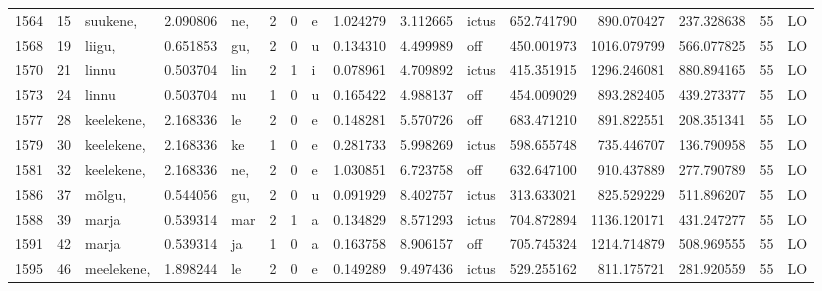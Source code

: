 \begin{tabular}{lrlrllllrrlrrrll}
1564 &          15 &         suukene, &  2.090806 &     ne, &        2 &      0 &       e &      1.024279 &      3.112665 &  ictus &   652.741790 &   890.070427 &   237.328638 &     55 &        LO \\
1568 &          19 &           liigu, &  0.651853 &     gu, &        2 &      0 &       u &      0.134310 &      4.499989 &    off &   450.001973 &  1016.079799 &   566.077825 &     55 &        LO \\
1570 &          21 &            linnu &  0.503704 &     lin &        2 &      1 &       i &      0.078961 &      4.709892 &  ictus &   415.351915 &  1296.246081 &   880.894165 &     55 &        LO \\
1573 &          24 &            linnu &  0.503704 &      nu &        1 &      0 &       u &      0.165422 &      4.988137 &    off &   454.009029 &   893.282405 &   439.273377 &     55 &        LO \\
1577 &          28 &       keelekene, &  2.168336 &      le &        2 &      0 &       e &      0.148281 &      5.570726 &    off &   683.471210 &   891.822551 &   208.351341 &     55 &        LO \\
1579 &          30 &       keelekene, &  2.168336 &      ke &        1 &      0 &       e &      0.281733 &      5.998269 &  ictus &   598.655748 &   735.446707 &   136.790958 &     55 &        LO \\
1581 &          32 &       keelekene, &  2.168336 &     ne, &        2 &      0 &       e &      1.030851 &      6.723758 &    off &   632.647100 &   910.437889 &   277.790789 &     55 &        LO \\
1586 &          37 &           mõlgu, &  0.544056 &     gu, &        2 &      0 &       u &      0.091929 &      8.402757 &  ictus &   313.633021 &   825.529229 &   511.896207 &     55 &        LO \\
1588 &          39 &            marja &  0.539314 &     mar &        2 &      1 &       a &      0.134829 &      8.571293 &  ictus &   704.872894 &  1136.120171 &   431.247277 &     55 &        LO \\
1591 &          42 &            marja &  0.539314 &      ja &        1 &      0 &       a &      0.163758 &      8.906157 &    off &   705.745324 &  1214.714879 &   508.969555 &     55 &        LO \\
1595 &          46 &       meelekene, &  1.898244 &      le &        2 &      0 &       e &      0.149289 &      9.497436 &  ictus &   529.255162 &   811.175721 &   281.920559 &     55 &        LO \\

\end{tabular}
